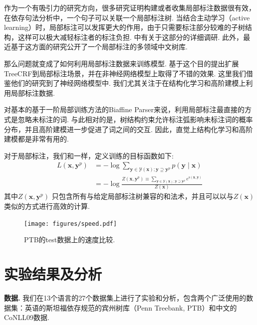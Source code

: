 作为一个有吸引力的研究方向，很多研究证明构建或者收集局部标注数据很有效\cite{nivre-etal-2014-squibs,hwa-99-partial-annotation,pereira-92-inside-outside}，在依存句法分析中，一个句子可以关联一个局部标注树.
当结合主动学习（active learning）时，局部标注可以发挥更大的作用，由于只需要标注部分较难的子树结构，这样可以极大减轻标注者的标注负担.
\cite{li-etal-2016-active}中有关于这部分的详细调研.
此外，\cite{peng-etal-2019-overview}最近基于这方面的研究公开了一个局部标注的多领域中文树库.

那么问题就变成了如何利用局部标注数据来训练模型.
\cite{li-etal-2016-active}基于这个目的提出扩展TreeCRF到局部标注场景，并在非神经网络模型上取得了不错的效果.
这里我们借鉴他们的研究到了神经网络模型中.
我们尤其关注于在结构化学习和高阶建模上利用局部标注数据.

对基本的基于一阶局部训练方法的Biaffine Parser来说，利用局部标注最直接的方式是忽略未标注的词.
与此相对的是，树结构约束允许标注弧影响未标注词的概率分布，并且高阶建模进一步促进了词之间的交互.
因此，直觉上结构化学习和高阶建模都是非常有用的.

对于局部标注，我们和\cite{li-etal-2016-active}一样，定义训练的目标函数如下:
\begin{equation}
    \label{eq:training-loss-treecrf-partial}
    \begin{split}
        \mathit{L}(\boldsymbol{x}, {\boldsymbol{y}^p}) &= -\log \sum\limits_{\boldsymbol{y} \in \mathcal{Y}(\boldsymbol{x}); \boldsymbol{y} \supseteq {\boldsymbol{y}^p}} p(\boldsymbol{y}\mid\boldsymbol{x})  \\
        &= - \log \frac{Z(\boldsymbol{x}, {\boldsymbol{y}^p}) \equiv \sum\limits_{\boldsymbol{y} \in \mathcal{Y}(\boldsymbol{x}); \boldsymbol{y} \supseteq \boldsymbol{y}^p} e^{\mathrm{s}(\boldsymbol{x},\boldsymbol{y})}}{Z(\boldsymbol{x})}
    \end{split}
\end{equation}
其中$Z(\boldsymbol{x}, {\boldsymbol{y}^p})$ 只包含所有与给定局部标注树兼容的和法术，并且可以以与$Z(\boldsymbol{x})$类似的方式进行高效的计算.

\begin{figure}[tb]
    \centering
    \texttt{[image: figures/speed.pdf]}
    \caption{
        PTB的test数据上的速度比较.
    }
    \label{fig:speed}
\end{figure}

\section{实验结果及分析}\label{sec:dep-exps}
\noindent\textbf{数据.}
我们在13个语言的27个数据集上进行了实验和分析，包含两个广泛使用的数据集：英语的斯坦福依存规范\cite{chen-manning-2014-fast}的宾州树库（Penn Treebank, PTB）和中文的CoNLL09数据\cite{hajic-etal-2009-conll}.

